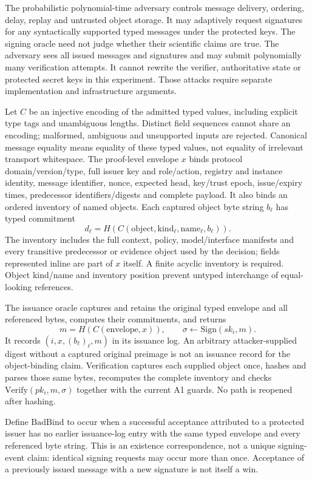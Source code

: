 The probabilistic polynomial-time adversary controls message delivery,
ordering, delay, replay and untrusted object storage. It may adaptively
request signatures for any syntactically supported typed messages under
the protected keys. The signing oracle need not judge whether their
scientific claims are true. The adversary sees all issued messages and
signatures and may submit polynomially many verification attempts. It
cannot rewrite the verifier, authoritative state or protected secret keys
in this experiment. Those attacks require separate implementation and
infrastructure arguments.

Let $C$ be an injective encoding of the admitted typed values, including
explicit type tags and unambiguous lengths. Distinct field sequences cannot
share an encoding; malformed, ambiguous and unsupported inputs are rejected.
Canonical message equality means equality of these typed values, not equality
of irrelevant transport whitespace. The proof-level envelope $x$ binds
protocol domain/version/type, full issuer key and role/action, registry and
instance identity, message identifier, nonce, expected head, key/trust epoch,
issue/expiry times, predecessor identifiers/digests and complete payload.
It also binds an ordered inventory of named objects. Each captured object
byte string $b_\ell$ has typed commitment
\[
 d_\ell=H(C(\mathrm{object},\mathrm{kind}_\ell,
                 \mathrm{name}_\ell,b_\ell)).
\]
The inventory includes the full context, policy, model/interface manifests
and every transitive predecessor or evidence object used by the decision;
fields represented inline are part of $x$ itself. A finite acyclic inventory
is required. Object kind/name and inventory position prevent untyped
interchange of equal-looking references.

The issuance oracle captures and retains the original typed envelope and
all referenced bytes, computes their commitments, and returns
\[
 m=H(C(\mathrm{envelope},x)),\qquad
 \sigma\leftarrow\mathrm{Sign}(sk_i,m).
\]
It records $(i,x,(b_\ell)_\ell,m)$ in its issuance log. An arbitrary
attacker-supplied digest without a captured original preimage is not an
issuance record for the object-binding claim. Verification captures each
supplied object once, hashes and parses those same bytes, recomputes the
complete inventory and checks $\mathrm{Verify}(pk_i,m,\sigma)$ together
with the current A1 guards. No path is reopened after hashing.

Define $\mathrm{BadBind}$ to occur when a successful acceptance attributed
to a protected issuer has no earlier issuance-log entry with the same
typed envelope and every referenced byte string. This is an existence
correspondence, not a unique signing-event claim: identical signing requests
may occur more than once. Acceptance of a previously issued message with a
new signature is not itself a win.


